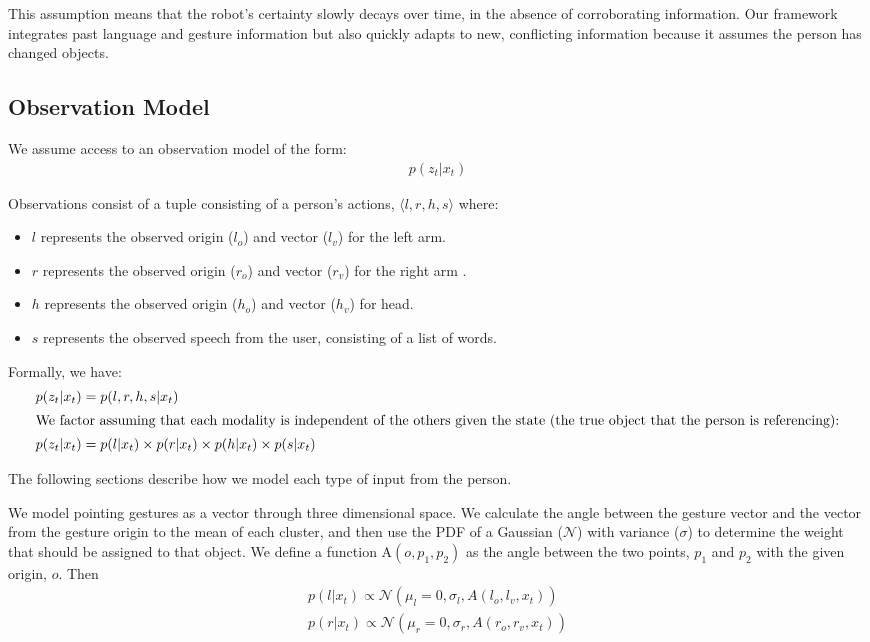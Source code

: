 \documentclass[letterpaper, 10 pt, conference]{ieeeconf}
\begin{document}
This assumption means that the robot's certainty slowly decays over
time, in the absence of corroborating information.  Our framework
integrates past language and gesture information but also quickly
adapts to new, conflicting information because it assumes the person
has changed objects.


\subsection{Observation Model}

We assume access to an observation model of the form:
\begin{align}
p(z_t | x_t)
\end{align}

Observations consist of a tuple consisting of a person's actions,
$\langle l, r, h, s\rangle $ where:
\begin{itemize}
	\item $l$ represents the observed origin ($l_o$) and vector ($l_v$) for the left arm.
	\item $r$ represents the observed origin  ($r_o$) and vector ($r_v$)  for the right arm .
	\item $h$ represents the observed origin  ($h_o$) and vector ($h_v$)  for head.
	\item $s$ represents the observed speech from the user,
          consisting of a list of words.
	\end{itemize}

Formally, we have:
\begin{align}
p(z_t | x_t) &= p(l, r, h, s | x_t)\\
\intertext{We factor assuming that each modality is independent of the others given the state (the true object that the person is referencing):}
p(z_t | x_t) &= p(l | x_t) \times p(r | x_t) \times p(h | x_t) \times p(s | x_t)
\end{align}

\noindent The following sections describe how we model each type of
input from the person.

  We model pointing gestures as a vector
through three dimensional space. We calculate the angle between the
gesture vector and the vector from the gesture origin to the mean of
each cluster, and then use the PDF of a Gaussian ($\mathcal{N}$) with variance ($\sigma$) to determine the weight that should be
assigned to that object. We define a function $\mbox{A}(o, p_1, p_2)$ as the
angle between the two points, $p_1$ and $p_2$ with the given origin,
$o$.  Then 
\begin{align}
p(l | x_t) \propto \mathcal{N}(\mu_l=0, \sigma_l,A(l_o, l_v, x_t))\\
p(r | x_t) \propto \mathcal{N}(\mu_r=0, \sigma_r,A(r_o, r_v, x_t))
\end{align}
\end{document}
